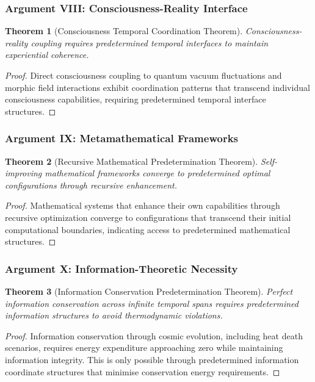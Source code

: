 \documentclass[12pt,a4paper]{article}
\newtheorem{theorem}{Theorem}[section]
\begin{document}
\subsubsection{Argument VIII: Consciousness-Reality Interface}

\begin{theorem}[Consciousness Temporal Coordination Theorem]
Consciousness-reality coupling requires predetermined temporal interfaces to maintain experiential coherence.
\end{theorem}

\begin{proof}
Direct consciousness coupling to quantum vacuum fluctuations and morphic field interactions exhibit coordination patterns that transcend individual consciousness capabilities, requiring predetermined temporal interface structures.
\end{proof}

\subsubsection{Argument IX: Metamathematical Frameworks}

\begin{theorem}[Recursive Mathematical Predetermination Theorem]
Self-improving mathematical frameworks converge to predetermined optimal configurations through recursive enhancement.
\end{theorem}

\begin{proof}
Mathematical systems that enhance their own capabilities through recursive optimization converge to configurations that transcend their initial computational boundaries, indicating access to predetermined mathematical structures.
\end{proof}

\subsubsection{Argument X: Information-Theoretic Necessity}

\begin{theorem}[Information Conservation Predetermination Theorem]
Perfect information conservation across infinite temporal spans requires predetermined information structures to avoid thermodynamic violations.
\end{theorem}

\begin{proof}
Information conservation through cosmic evolution, including heat death scenarios, requires energy expenditure approaching zero while maintaining information integrity. This is only possible through predetermined information coordinate structures that minimise conservation energy requirements.
\end{proof}
\end{document}
